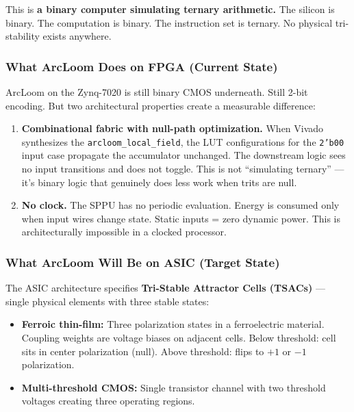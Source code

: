\documentclass[11pt,a4paper]{article}
\begin{document}
This is \textbf{a binary computer simulating ternary arithmetic.} The silicon is binary. The computation is binary. The instruction set is ternary. No physical tri-stability exists anywhere.

\subsubsection{What ArcLoom Does on FPGA (Current State)}

ArcLoom on the Zynq-7020 is still binary CMOS underneath. Still 2-bit encoding. But two architectural properties create a measurable difference:

\begin{enumerate}
    \item \textbf{Combinational fabric with null-path optimization.} When Vivado synthesizes the \texttt{arcloom\_local\_field}, the LUT configurations for the \texttt{2'b00} input case propagate the accumulator unchanged. The downstream logic sees no input transitions and does not toggle. This is not ``simulating ternary'' --- it's binary logic that genuinely does less work when trits are null.

    \item \textbf{No clock.} The SPPU has no periodic evaluation. Energy is consumed only when input wires change state. Static inputs = zero dynamic power. This is architecturally impossible in a clocked processor.
\end{enumerate}

\subsubsection{What ArcLoom Will Be on ASIC (Target State)}

The ASIC architecture specifies \textbf{Tri-Stable Attractor Cells (TSACs)} --- single physical elements with three stable states:

\begin{itemize}
    \item \textbf{Ferroic thin-film:} Three polarization states in a ferroelectric material. Coupling weights are voltage biases on adjacent cells. Below threshold: cell sits in center polarization (null). Above threshold: flips to $+1$ or $-1$ polarization.
    \item \textbf{Multi-threshold CMOS:} Single transistor channel with two threshold voltages creating three operating regions.
\end{itemize}
\end{document}
